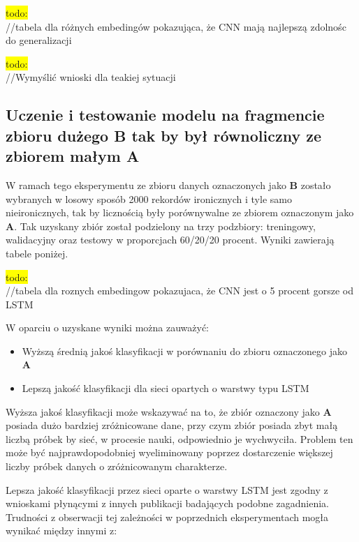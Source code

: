 \colorbox{yellow}{todo:}\\
//tabela dla różnych embedingów pokazująca, że CNN mają najlepszą zdolnośc do generalizacji

\colorbox{yellow}{todo:}\\
//Wymyślić wnioski dla teakiej sytuacji


\subsection{Uczenie i testowanie modelu na fragmencie zbioru dużego B tak by był równoliczny ze zbiorem małym A}

W ramach tego eksperymentu ze zbioru danych oznaczonych jako \textbf{B} zostało wybranych w losowy sposób 2000 rekordów ironicznych i tyle samo nieironicznych, tak by licznością były porównywalne ze zbiorem oznaczonym jako \textbf{A}. Tak uzyskany zbiór został podzielony na trzy podzbiory: treningowy, walidacyjny oraz testowy w proporcjach 60/20/20 procent. Wyniki zawierają tabele poniżej.

\colorbox{yellow}{todo:}\\
//tabela dla roznych embedingow pokazujaca, że CNN jest o 5 procent gorsze od LSTM

W oparciu o uzyskane wyniki można zauważyć:

\begin{itemize}
    \item Wyższą średnią jakoś klasyfikacji w porównaniu do zbioru oznaczonego jako \textbf{A}
    \item Lepszą jakość klasyfikacji dla sieci opartych o warstwy typu LSTM
\end{itemize}


Wyższa jakoś klasyfikacji może wskazywać na to, że zbiór oznaczony jako \textbf{A} posiada dużo bardziej zróżnicowane dane, przy czym zbiór posiada zbyt małą liczbą próbek by sieć, w procesie nauki, odpowiednio je wychwyciła. Problem ten może być najprawdopodobniej wyeliminowany poprzez dostarczenie większej liczby próbek danych o zróżnicowanym charakterze.

Lepsza jakość klasyfikacji przez sieci oparte o warstwy LSTM jest zgodny z wnioskami płynącymi z innych publikacji badających podobne zagadnienia. Trudności z obserwacji tej zależności w poprzednich eksperymentach mogła wynikać między innymi z:


